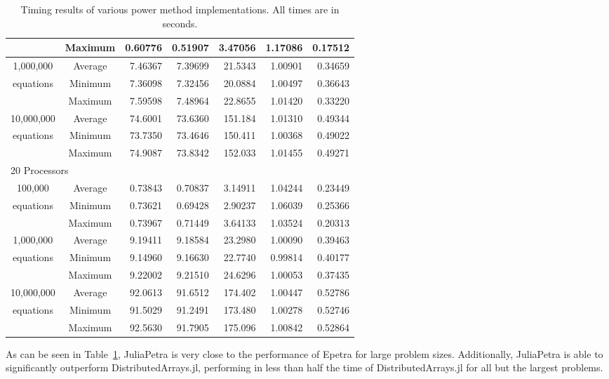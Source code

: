 \documentclass[acmsmall]{acmart}
\begin{document}
\begin{table}
\begin{tabular}{|c c|r|r|r||r|r|}
							&Maximum & 0.60776 & 0.51907 & 3.47056 & 1.17086 & 0.17512 \\
		\hline
			1,000,000		&Average & 7.46367 & 7.39699 & 21.5343 & 1.00901 & 0.34659 \\
			equations		&Minimum & 7.36098 & 7.32456 & 20.0884 & 1.00497 & 0.36643 \\
							&Maximum & 7.59598 & 7.48964 & 22.8655 & 1.01420 & 0.33220 \\
		\hline
			10,000,000		&Average & 74.6001 & 73.6360 & 151.184 & 1.01310 & 0.49344 \\
			equations		&Minimum & 73.7350 & 73.4646 & 150.411 & 1.00368 & 0.49022 \\
							&Maximum & 74.9087 & 73.8342 & 152.033 & 1.01455 & 0.49271 \\
		\hline
				\multicolumn{7}{|l|}{20 Processors}\\
		\hline
			100,000			&Average & 0.73843 & 0.70837 & 3.14911 & 1.04244 & 0.23449 \\
			equations		&Minimum & 0.73621 & 0.69428 & 2.90237 & 1.06039 & 0.25366 \\
							&Maximum & 0.73967 & 0.71449 & 3.64133 & 1.03524 & 0.20313 \\
		\hline
			1,000,000		&Average & 9.19411 & 9.18584 & 23.2980 & 1.00090 & 0.39463 \\
			equations		&Minimum & 9.14960 & 9.16630 & 22.7740 & 0.99814 & 0.40177 \\
							&Maximum & 9.22002 & 9.21510 & 24.6296 & 1.00053 & 0.37435 \\
		\hline
			10,000,000		&Average & 92.0613 & 91.6512 & 174.402 & 1.00447 & 0.52786 \\
			equations		&Minimum & 91.5029 & 91.2491 & 173.480 & 1.00278 & 0.52746 \\
							&Maximum & 92.5630 & 91.7905 & 175.096 & 1.00842 & 0.52864 \\
		\hline
	\end{tabular}
	
	\caption{Timing results of various power method implementations.  All times are in seconds.}
	\label{tab:timing-results}
\end{table}

As can be seen in Table~\ref{tab:timing-results}, JuliaPetra is very close to the performance
of Epetra for large problem sizes.
Additionally, JuliaPetra is able to significantly outperform DistributedArrays.jl, performing in less than
half the time of DistributedArrays.jl for all but the largest problems.
\end{document}

